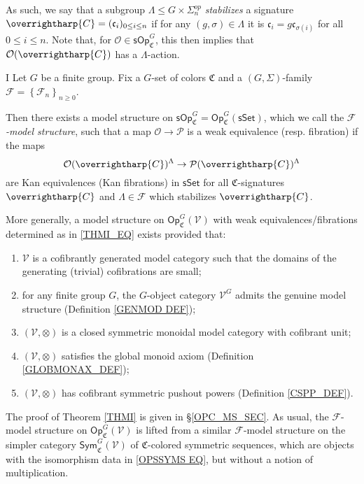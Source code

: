 \documentclass[a4paper,10pt
,draft
]{article}%
\numberwithin{equation}{section}
\numberwithin{figure}{section}
\theoremstyle{definition} %
\newcommand{\set}[1]{\left\{#1\right\}}%
\newcommand{\vect}[1]{\text{\overrightharp{\ensuremath{#1}}}}
\newcommand{\Op}{\mathsf{Op}}%
\newcommand{\F}{\ensuremath{\mathcal F}}
\newcommand{\V}{\ensuremath{\mathcal V}}
\renewcommand{\O}{\ensuremath{\mathcal O}}
\newcommand{\1}{\ensuremath{\mathbbm 1}}%
\begin{document}
As such, we say that a subgroup 
$\Lambda \leq G \times \Sigma_n^{op}$
\emph{stabilizes} a signature $\vect{C}=(\mathfrak{c}_i)_{0 \leq i \leq n}$
if for any 
$(g,\sigma) \in \Lambda$ it is 
$\mathfrak{c}_i = g \mathfrak{c}_{\sigma(i)}$ for all $0 \leq i \leq n$.
Note that,
for $\O \in \mathsf{sOp}^G_{\mathfrak{C}}$,
this then implies that $\O(\vect{C})$ has a $\Lambda$-action.




\begin{customthm}{I}\label{THMI}
Let $G$ be a finite group. Fix a $G$-set of colors $\mathfrak{C}$
and a $(G,\Sigma)$-family $\F = \set{\F_n}_{n \geq 0}$.

Then there exists a model structure on
$\mathsf{sOp}^G_{\mathfrak{C}} = 
\mathsf{Op}^G_{\mathfrak{C}}(\mathsf{sSet})$,
which we call the \emph{$\mathcal{F}$-model structure},
such that a map
$\mathcal{O} \to \mathcal{P}$
is a weak equivalence (resp. fibration) if the maps
\begin{equation}\label{THMI_EQ}
	\O(\vect{C})^{\Lambda} \to \mathcal{P}(\vect{C})^{\Lambda}
\end{equation}
are Kan equivalences (Kan fibrations)
in $\mathsf{sSet}$
for all $\mathfrak{C}$-signatures $\vect{C}$
and $\Lambda \in \F$ which stabilizes $\vect{C}$.

More generally, a model structure on 
$\Op^G_{\mathfrak C}(\V)$
with weak equivalences/fibrations determined as in 
\eqref{THMI_EQ}
exists provided that:
\begin{enumerate}[label = (\roman*)]
	\item $\V$ is a cofibrantly generated model category
	such that the domains of the generating (trivial) cofibrations are small;
	\item for any finite group $G$, the $G$-object category $\V^G$ admits the genuine model structure (Definition \ref{GENMOD DEF});
	\item $(\V, \otimes)$ is a closed symmetric monoidal model category with cofibrant unit;
	\item $(\V, \otimes)$ satisfies the global monoid axiom (Definition \ref{GLOBMONAX_DEF});
	\item $(\V, \otimes)$ has cofibrant symmetric pushout powers (Definition \ref{CSPP_DEF}).
\end{enumerate}
\end{customthm}


The proof of Theorem \ref{THMI} is given in \S \ref{OPC_MS_SEC}.
As usual, the $\F$-model structure on 
$\Op^G_{\mathfrak C}(\V)$ is lifted from 
a similar $\F$-model structure on the simpler category
$\mathsf{Sym}^G_{\mathfrak C}(\V)$
of $\mathfrak{C}$-colored symmetric sequences,
which are objects with the isomorphism data in 
\eqref{OPSSYMS EQ}, but without a notion of multiplication. 
\end{document}
